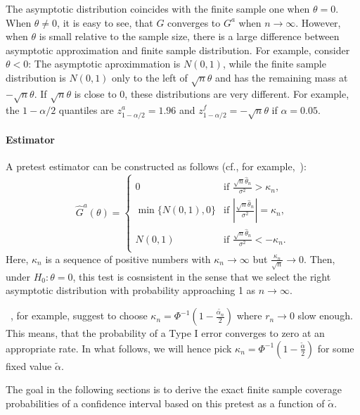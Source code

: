 \documentclass[12pt,a4paper,english]{article} %
\numberwithin{equation}{section}
\theoremstyle{definition}
\theoremstyle{remark}
\theoremstyle{plain}
\begin{document}
The asymptotic distribution coincides with the finite sample one when $\theta=0$.
When $\theta\neq0$, it is easy to see, that $G$ converges to $G^a$ when $n\to\infty$.
However, when $\theta$ is small relative to the sample size, there is a large difference between asymptotic approximation and finite sample distribution.
For example, consider $\theta < 0$: The asymptotic aproximmation is $N(0,1)$, while the finite sample distribution is $N(0,1)$ only to the left of $\sqrt{n}\theta$ and has the remaining mass at $-\sqrt{n}\theta$.
If $\sqrt{n}\theta$ is close to $0$, these distributions are very different.
For example, the $1-\alpha/2$ quantiles are $z^a_{1-\alpha/2} = 1.96$ and $z^f_{1-\alpha/2} = -\sqrt{n}\theta$ if $\alpha=0.05$.

\paragraph{Estimator}
A pretest estimator can be constructed as follows (cf., for example,~\cite{fang2019infdirdiff}):
\begin{equation}
  \hat{G}^a(\theta)=
    \begin{cases}
      0 & \text{if } \frac{\sqrt{n}\hat{\theta}_n}{\sigma^2} > \kappa_n,\\
      \min\{N(0,1), 0\}& \text{if } |\frac{\sqrt{n}\hat{\theta}_n}{\sigma^2}| = \kappa_n,\\
      N(0,1)& \text{if } \frac{\sqrt{n}\hat{\theta}_n}{\sigma^2} < - \kappa_n.\\
  \end{cases}
\end{equation}
Here, $\kappa_n$ is a sequence of positive numbers with $\kappa_n \to \infty$ but $\frac{\kappa_n}{\sqrt{n}} \to 0$.
Then, under $H_0: \theta = 0$, this test is cosnsistent in the sense that we select the right asymptotic distribution with probability approaching 1 as $n\to\infty$.

~\cite{fang2019infdirdiff}, for example, suggest to choose $\kappa_n = \Phi^{-1}(1-\frac{\tilde{\alpha_n}}{2})$ where $r_n\to 0$ slow enough.
This means, that the probability of a Type I error converges to zero at an appropriate rate.
In what follows, we will hence pick $\kappa_n = \Phi^{-1}(1-\frac{\tilde{\alpha}}{2})$ for some fixed value $\tilde{\alpha}$.

The goal in the following sections is to derive the exact finite sample coverage probabilities of a confidence interval based on this pretest as a function of $\tilde{\alpha}$.



\end{document}

